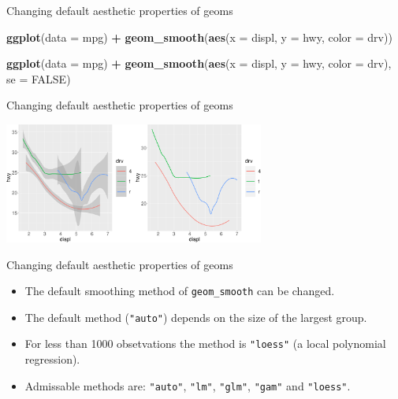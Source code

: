 \documentclass[ignorenonframetext,]{beamer}
\newenvironment{Shaded}{\begin{snugshade}}{\end{snugshade}}
\newcommand{\DataTypeTok}[1]{\textcolor[rgb]{0.13,0.29,0.53}{#1}}
\newcommand{\KeywordTok}[1]{\textcolor[rgb]{0.13,0.29,0.53}{\textbf{#1}}}
\newcommand{\NormalTok}[1]{#1}
\newcommand{\OperatorTok}[1]{\textcolor[rgb]{0.81,0.36,0.00}{\textbf{#1}}}
\newcommand{\OtherTok}[1]{\textcolor[rgb]{0.56,0.35,0.01}{#1}}
\newcommand{\StringTok}[1]{\textcolor[rgb]{0.31,0.60,0.02}{#1}}
\begin{document}
\begin{frame}[fragile]{Changing default aesthetic properties of geoms}
\protect\hypertarget{changing-default-aesthetic-properties-of-geoms-29}{}

\begin{Shaded}
\begin{Highlighting}[]
\KeywordTok{ggplot}\NormalTok{(}\DataTypeTok{data =}\NormalTok{ mpg) }\OperatorTok{+}\StringTok{ }
\StringTok{  }\KeywordTok{geom_smooth}\NormalTok{(}\KeywordTok{aes}\NormalTok{(}\DataTypeTok{x =}\NormalTok{ displ, }\DataTypeTok{y =}\NormalTok{ hwy, }\DataTypeTok{color =}\NormalTok{ drv))}

\KeywordTok{ggplot}\NormalTok{(}\DataTypeTok{data =}\NormalTok{ mpg) }\OperatorTok{+}\StringTok{ }
\StringTok{  }\KeywordTok{geom_smooth}\NormalTok{(}\KeywordTok{aes}\NormalTok{(}\DataTypeTok{x =}\NormalTok{ displ, }\DataTypeTok{y =}\NormalTok{ hwy, }\DataTypeTok{color =}\NormalTok{ drv),}
    \DataTypeTok{se =} \OtherTok{FALSE}\NormalTok{)}
\end{Highlighting}
\end{Shaded}

\end{frame}

\begin{frame}{Changing default aesthetic properties of geoms}
\protect\hypertarget{changing-default-aesthetic-properties-of-geoms-30}{}

\begin{center}\includegraphics[height=150px]{data-visualization_files/figure-beamer/unnamed-chunk-63-1} \end{center}

\end{frame}

\begin{frame}[fragile]{Changing default aesthetic properties of geoms}
\protect\hypertarget{changing-default-aesthetic-properties-of-geoms-31}{}

\begin{itemize}
\item
  The default smoothing method of \texttt{geom\_smooth} can be changed.
\item
  The default method (\texttt{"auto"}) depends on the size of the
  largest group.
\item
  For less than 1000 obsetvations the method is \texttt{"loess"} (a
  local polynomial regression).
\item
  Admissable methods are: \texttt{"auto"}, \texttt{"lm"},
  \texttt{"glm"}, \texttt{"gam"} and \texttt{"loess"}.
\end{itemize}

\end{frame}
\end{document}
